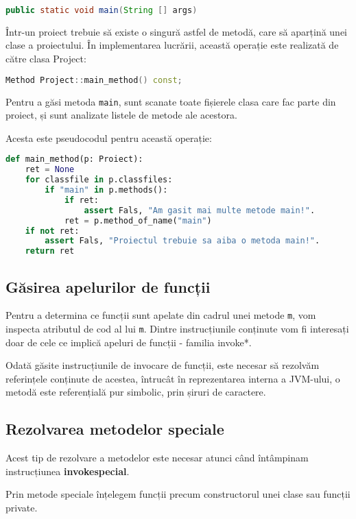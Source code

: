 \begin{lstlisting}[language=Java]
public static void main(String [] args)
\end{lstlisting}

Într-un proiect trebuie să existe o singură astfel de metodă, care să aparțină
unei clase a proiectului.
În implementarea lucrării, această operație este realizată de
către clasa Project:
\begin{lstlisting}[language=C++]
Method Project::main_method() const;
\end{lstlisting}

Pentru a găsi metoda \texttt{main}, sunt scanate toate fișierele
clasa care fac parte din proiect, și sunt analizate listele de
metode ale acestora.

Acesta este pseudocodul pentru această operație:
\begin{lstlisting}[language=Python]
def main_method(p: Proiect):
    ret = None
    for classfile in p.classfiles:
        if "main" in p.methods():
            if ret:
                assert Fals, "Am gasit mai multe metode main!".
            ret = p.method_of_name("main")
    if not ret:
        assert Fals, "Proiectul trebuie sa aiba o metoda main!".
    return ret
\end{lstlisting}

\subsection{Găsirea apelurilor de funcții}

Pentru a determina ce funcții sunt apelate din cadrul unei metode \texttt{m},
vom inspecta atributul de cod al lui \texttt{m}.
Dintre instrucțiunile conținute vom fi interesați doar de cele ce implică
apeluri de funcții - familia invoke*.

Odată găsite instrucțiunile de invocare de funcții, este necesar să rezolvăm
referințele conținute de acestea, întrucât în reprezentarea interna a JVM-ului,
o metodă este referențială pur simbolic, prin șiruri de caractere.

\subsection{Rezolvarea metodelor speciale}

Acest tip de rezolvare a metodelor este necesar atunci când întâmpinam
instrucțiunea \textbf{invokespecial}.

Prin metode speciale înțelegem funcții precum constructorul unei clase sau
funcții private.

